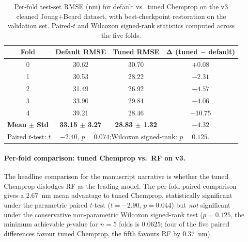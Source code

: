 \documentclass[journal=jcisd8,manuscript=suppinfo]{achemso}
\begin{document}
\begin{table}[htbp]
\centering
\caption{Per-fold test-set RMSE (nm) for default vs.\ tuned Chemprop on the v3 cleaned Joung+Beard dataset, with best-checkpoint restoration on the validation set. Paired-$t$ and Wilcoxon signed-rank statistics computed across the five folds.}
\label{tab:si_chemprop_tuned_perfold}
\small
\begin{tabular}{cccc}
\toprule
\textbf{Fold} & \textbf{Default RMSE} & \textbf{Tuned RMSE} & $\boldsymbol{\Delta}$ \textbf{(tuned $-$ default)} \\
\midrule
0 & 30.62 & 30.70 & $+0.08$ \\
1 & 30.53 & 28.22 & $-2.31$ \\
2 & 31.49 & 26.92 & $-4.57$ \\
3 & 33.90 & 29.84 & $-4.06$ \\
4 & 39.21 & 28.46 & $-10.75$ \\
\midrule
\textbf{Mean $\pm$ Std} & \textbf{33.15 $\pm$ 3.27} & \textbf{28.83 $\pm$ 1.32} & \textbf{$-4.32$} \\
\bottomrule
\multicolumn{4}{l}{\footnotesize Paired $t$-test: $t = -2.40$, $p = 0.074$;\quad Wilcoxon signed-rank: $p = 0.125$.} \\
\end{tabular}
\end{table}

\paragraph{Per-fold comparison: tuned Chemprop vs.\ RF on v3.}
The headline comparison for the manuscript narrative is whether the tuned Chemprop dislodges RF as the leading model. The per-fold paired comparison gives a 2.67~nm mean advantage to tuned Chemprop, statistically significant under the parametric paired $t$-test ($t = -2.90$, $p = 0.044$) but \emph{not} significant under the conservative non-parametric Wilcoxon signed-rank test ($p = 0.125$, the minimum achievable $p$-value for $n = 5$ folds is $0.0625$; four of the five paired differences favour tuned Chemprop, the fifth favours RF by $0.37$~nm).
\end{document}
